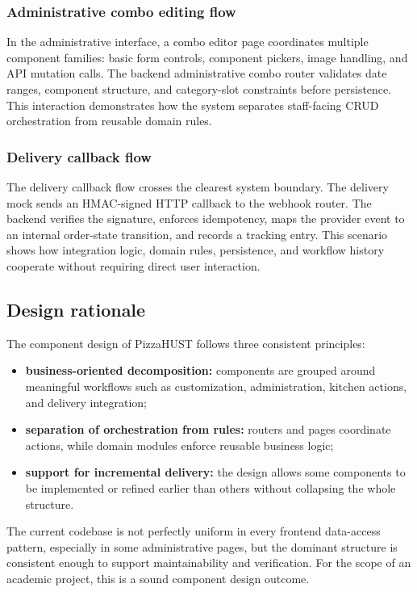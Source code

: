 \subsubsection{Administrative combo editing flow}

In the administrative interface, a combo editor page coordinates multiple component families: basic form controls, component pickers, image handling, and API mutation calls. The backend administrative combo router validates date ranges, component structure, and category-slot constraints before persistence. This interaction demonstrates how the system separates staff-facing CRUD orchestration from reusable domain rules.

\subsubsection{Delivery callback flow}

The delivery callback flow crosses the clearest system boundary. The delivery mock sends an HMAC-signed HTTP callback to the webhook router. The backend verifies the signature, enforces idempotency, maps the provider event to an internal order-state transition, and records a tracking entry. This scenario shows how integration logic, domain rules, persistence, and workflow history cooperate without requiring direct user interaction.

\subsection{Design rationale}

The component design of PizzaHUST follows three consistent principles:

\begin{itemize}
    \item \textbf{business-oriented decomposition:} components are grouped around meaningful workflows such as customization, administration, kitchen actions, and delivery integration;
    \item \textbf{separation of orchestration from rules:} routers and pages coordinate actions, while domain modules enforce reusable business logic;
    \item \textbf{support for incremental delivery:} the design allows some components to be implemented or refined earlier than others without collapsing the whole structure.
\end{itemize}

The current codebase is not perfectly uniform in every frontend data-access pattern, especially in some administrative pages, but the dominant structure is consistent enough to support maintainability and verification. For the scope of an academic project, this is a sound component design outcome.

